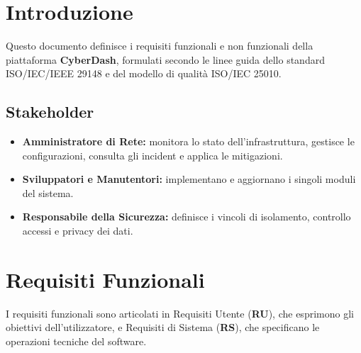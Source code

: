 \documentclass{article}
\begin{document}
\newpage

\section{Introduzione}
Questo documento definisce i requisiti funzionali e non funzionali della piattaforma \textbf{CyberDash}, formulati secondo le linee guida dello standard ISO/IEC/IEEE 29148 e del modello di qualità ISO/IEC 25010.

\subsection{Stakeholder}
\begin{itemize}
    \item \textbf{Amministratore di Rete:} monitora lo stato dell'infrastruttura, gestisce le configurazioni, consulta gli incident e applica le mitigazioni.
    \item \textbf{Sviluppatori e Manutentori:} implementano e aggiornano i singoli moduli del sistema.
    \item \textbf{Responsabile della Sicurezza:} definisce i vincoli di isolamento, controllo accessi e privacy dei dati.
\end{itemize}

\section{Requisiti Funzionali}
I requisiti funzionali sono articolati in Requisiti Utente (\textbf{RU}), che esprimono gli obiettivi dell'utilizzatore, e Requisiti di Sistema (\textbf{RS}), che specificano le operazioni tecniche del software.
\end{document}
